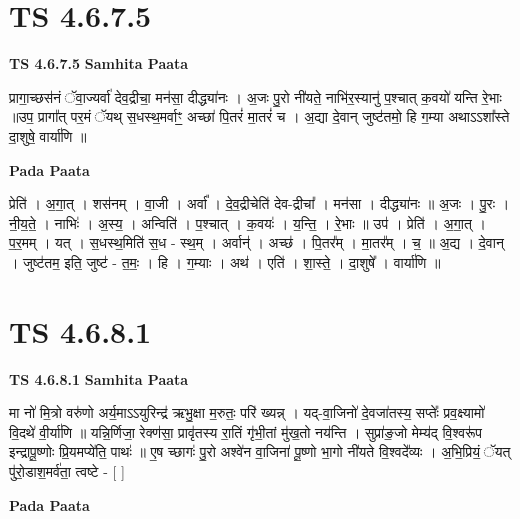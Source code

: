 \documentclass[17pt]{extarticle}
\begin{document}
\section*{ TS 4.6.7.5 }

\textbf{TS 4.6.7.5 } \newline
\textbf{Samhita Paata} \newline

प्रागा॒च्छस॑नं ॅवा॒ज्यर्वा॑ देव॒द्रीचा॒ मन॑सा॒ दीद्ध्या॑नः । अ॒जः पु॒रो नी॑यते॒ नाभि॑र॒स्यानु॑ प॒श्चात् क॒वयो॑ यन्ति रे॒भाः ॥उप॒ प्रागा᳚त् पर॒मं ॅयथ् स॒धस्थ॒मर्वाꣳ॒॒ अच्छा॑ पि॒तरं॑ मा॒तरं॑ च । अ॒द्या दे॒वान् जुष्ट॑तमो॒ हि ग॒म्या अथाऽऽशा᳚स्ते दा॒शुषे॒ वार्या॑णि ॥ \newline

\textbf{Pada Paata} \newline

प्रेति॑ । अ॒गा॒त् । शस॑नम् । वा॒जी । अर्वा᳚ । दे॒व॒द्रीचेति॑ देव-द्रीचा᳚ । मन॑सा । दीद्ध्या॑नः ॥ अ॒जः । पु॒रः । नी॒य॒ते॒ । नाभिः॑ । अ॒स्य॒ । अन्विति॑ । प॒श्चात् । क॒वयः॑ । य॒न्ति॒ । रे॒भाः ॥ उप॑ । प्रेति॑ । अ॒गा॒त् । प॒र॒मम् । यत् । स॒धस्थ॒मिति॑ स॒ध - स्थ॒म् । अर्वान्॑ । अच्छ॑ । पि॒तर᳚म् । मा॒तर᳚म् । च॒ ॥ अ॒द्य । दे॒वान् । जुष्ट॑तम॒ इति॒ जुष्ट॑ - त॒मः॒ । हि । ग॒म्याः । अथ॑ । एति॑ । शा॒स्ते॒ । दा॒शुषे᳚ । वार्या॑णि ॥  \newline




\section*{ TS 4.6.8.1 }

\textbf{TS 4.6.8.1 } \newline
\textbf{Samhita Paata} \newline

मा नो॑ मि॒त्रो वरु॑णो अर्य॒माऽऽयुरिन्द्र॑ ऋभु॒क्षा म॒रुतः॒ परि॑ ख्यन्न् । यद्-वा॒जिनो॑ दे॒वजा॑तस्य॒ सप्तेः᳚ प्रव॒क्ष्यामो॑ वि॒दथे॑ वी॒र्या॑णि ॥ यन्नि॒र्णिजा॒ रेक्ण॑सा॒ प्रावृ॑तस्य रा॒तिं गृ॑भी॒तां मु॑ख॒तो नय॑न्ति । सुप्रा॑ङ॒जो मेम्य॑द् वि॒श्वरू॑प इन्द्रापू॒ष्णोः प्रि॒यमप्ये॑ति॒ पाथः॑ ॥ ए॒ष च्छागः॑ पु॒रो अश्वे॑न वा॒जिना॑ पू॒ष्णो भा॒गो नी॑यते वि॒श्वदे᳚व्यः । अ॒भि॒प्रियं॒ ॅयत् पु॑रो॒डाश॒मर्व॑ता॒ त्वष्टे - [  ] \newline

\textbf{Pada Paata} \newline
\end{document}
